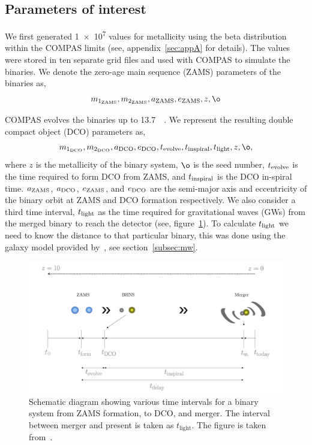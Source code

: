 
\subsection{Parameters of interest}
We first generated \num{1e7} values for metallicity using the beta distribution within the COMPAS limits (see, appendix~\ref{sec:appA} for details).
The values were stored in ten separate grid files and used with COMPAS to simulate the binaries.
We denote the zero-age main sequence (ZAMS) parameters of the binaries as,
\begin{equation}%
    \mone{ZAMS}, \mtwo{ZAMS}, \semaxis{ZAMS}, \ecc{ZAMS}, z, \o
\end{equation}%

COMPAS evolves the binaries up to \SI{13.7}{\giga\yr}.
We represent the resulting double compact object (DCO) parameters as,
\begin{equation}%
    \mone{DCO}, \mtwo{DCO}, \semaxis{DCO}, \ecc{DCO}, \interval{evolve}, \interval{inspiral}, \interval{light}, z, \o,
\end{equation}%
where $z$ is the metallicity of the binary system, $\o$ is the seed number, $t_\text{evolve}$ is the time required to form DCO from ZAMS, and $t_\text{inspiral}$ is the DCO in-spiral time. $a_{\text{ZAMS}}$, $a_{\text{DCO}}$, $e_\text{ZAMS}$, and $e_\text{DCO}$ are the semi-major axis and eccentricity of the binary orbit at ZAMS and DCO formation respectively.
We also consider a third time interval, $t_\text{light}$ as the time required for gravitational waves (GWs) from
the merged binary to reach the detector (see, figure~\ref{fig:binaryevolution}). To calculate $t_\text{light}$ we
need to know the distance to that particular binary, this was done using the galaxy model provided by~\cite{
    wagg2021gravitational}, see section~\ref{subsec:mw}.
\begin{figure}[!ht]%
    \centering
    \includegraphics[width=\linewidth]{images/binary_evolution}
    \caption{Schematic diagram showing various time intervals for a binary system from ZAMS formation, to DCO, and merger. The interval between merger and present is taken as $t_\text{light}$. The figure is taken from~\cite{Riley2022}.}
    \label{fig:binaryevolution}
\end{figure}%

